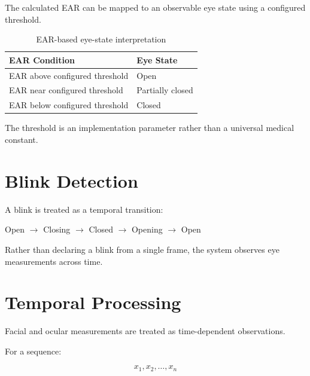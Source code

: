 \documentclass{tietreport}
\begin{document}
The calculated EAR can be mapped to an observable eye state using a
configured threshold.

\begin{table}[H]
\centering
\caption{EAR-based eye-state interpretation}
\label{tab:eye-state}

\begin{tabularx}{0.75\textwidth}{@{}P{5cm}Y@{}}

\toprule
\textbf{EAR Condition} & \textbf{Eye State}\\
\midrule

EAR above configured threshold & Open\\
EAR near configured threshold & Partially closed\\
EAR below configured threshold & Closed\\

\bottomrule

\end{tabularx}
\end{table}

The threshold is an implementation parameter rather than a universal
medical constant.


\section{Blink Detection}

A blink is treated as a temporal transition:

\begin{center}

Open
$\rightarrow$
Closing
$\rightarrow$
Closed
$\rightarrow$
Opening
$\rightarrow$
Open

\end{center}

Rather than declaring a blink from a single frame, the system observes
eye measurements across time.


\section{Temporal Processing}

Facial and ocular measurements are treated as time-dependent
observations.

For a sequence:

\[
x_1,x_2,\ldots,x_n
\]
\end{document}
